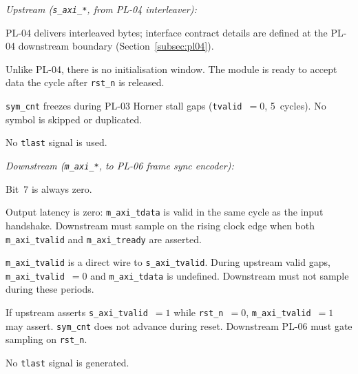 \textit{Upstream (\texttt{s\_axi\_*}, from PL-04 interleaver):}
\begin{tightemize}
  \item PL-04 delivers interleaved bytes; interface contract details are
        defined at the PL-04 downstream boundary
        (Section~\ref{subsec:pl04}).
  \item Unlike PL-04, there is no initialisation window. The module is
        ready to accept data the cycle after \texttt{rst\_n} is released.
  \item \texttt{sym\_cnt} freezes during PL-03 Horner stall gaps
        (\texttt{tvalid}~$= 0$, 5~cycles). No symbol is skipped or
        duplicated.
  \item No \texttt{tlast} signal is used.
\end{tightemize}

\textit{Downstream (\texttt{m\_axi\_*}, to PL-06 frame sync encoder):}
\begin{tightemize}
  \item Bit~7 is always zero.
  \item Output latency is zero: \texttt{m\_axi\_tdata} is valid in the
        same cycle as the input handshake. Downstream must sample on the
        rising clock edge when both \texttt{m\_axi\_tvalid} and
        \texttt{m\_axi\_tready} are asserted.
  \item \texttt{m\_axi\_tvalid} is a direct wire to
        \texttt{s\_axi\_tvalid}. During upstream valid gaps,
        \texttt{m\_axi\_tvalid}~$= 0$ and \texttt{m\_axi\_tdata} is
        undefined. Downstream must not sample during these periods.
  \item If upstream asserts \texttt{s\_axi\_tvalid}~$= 1$ while
        \texttt{rst\_n}~$= 0$, \texttt{m\_axi\_tvalid}~$= 1$ may assert.
        \texttt{sym\_cnt} does not advance during reset. Downstream
        PL-06 must gate sampling on \texttt{rst\_n}.
  \item No \texttt{tlast} signal is generated.
\end{tightemize}

\FloatBarrier


